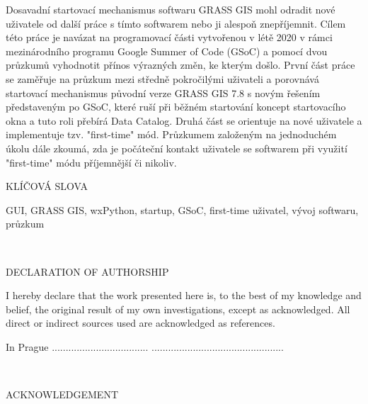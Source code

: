 \documentclass[a4paper,10pt,twoside]{article}
\begin{document}
\large
\noindent
Dosavadní startovací mechanismus softwaru GRASS GIS mohl odradit nové uživatele od další práce s tímto softwarem nebo ji alespoň znepříjemnit. Cílem této práce je navázat na programovací části vytvořenou v létě 2020 v rámci mezinárodního programu Google Summer of Code (GSoC) a pomocí dvou průzkumů vyhodnotit přínos výrazných změn, ke kterým došlo. První část práce se zaměřuje na průzkum mezi středně pokročilými uživateli a porovnává startovací mechanismus původní verze GRASS GIS 7.8 s novým řešením představeným po GSoC, které ruší při běžném startování koncept startovacího okna a tuto roli přebírá Data Catalog. Druhá část se orientuje na nové uživatele a implementuje tzv. "first-time" mód. Průzkumem založeným na jednoduchém úkolu dále zkoumá, zda je počáteční kontakt uživatele se softwarem při využití "first-time" módu příjemnější či nikoliv.

\vspace{2ex}
\begin{Large}
\noindent KLÍČOVÁ SLOVA
\end{Large}

\large
\noindent
\textrm{GUI, GRASS GIS, wxPython, startup, GSoC, first-time uživatel, vývoj softwaru, průzkum}



\newpage ~ \newpage
\thispagestyle{empty}


\newpage
\mbox{}
\vfill
\begin{Large}
\noindent DECLARATION OF AUTHORSHIP
\end{Large}

I hereby declare that the work presented here is, to the best of my knowledge and belief, the original result of my own investigations, except as acknowledged. All direct or indirect sources used are acknowledged as references.
\vspace{3ex}

\noindent In Prague ................................... \hfill ................................................


\newpage ~ \newpage
\thispagestyle{empty}



\newpage
\mbox{}
\vfill
\begin{Large}
\noindent ACKNOWLEDGEMENT
\end{Large}
\end{document}
